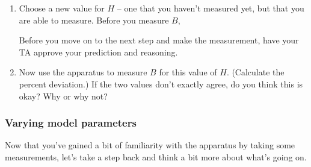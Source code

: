 \begin{enumerate}[series=labproc,label={\bf \arabic*.},
		ref=\textcolor{black}{\arabic*}]

\item
Choose a new value for $H$ -- one that you haven't measured yet,
but that you are able to measure.  
Before you measure $B$, 

Before you move on to the next step and make the measurement, 
have your TA approve your prediction and reasoning.

\item
Now use the apparatus to measure $B$ for this value of $H$.  
(Calculate the percent deviation.)
If the two values don't exactly agree, do
you think this is okay?  
Why or why not?

\end{enumerate}



\subsubsection*{Varying model parameters}

Now that you've gained a bit of familiarity with the apparatus
by taking some measurements, 
let's take a step back and think a bit more about what's going on.

